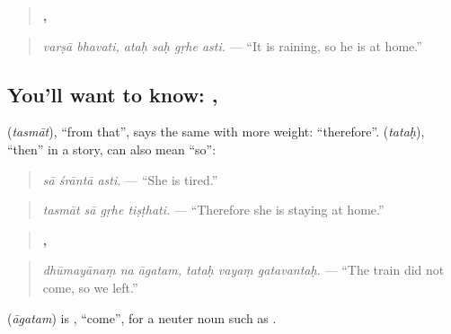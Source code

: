 \begin{quote}
\textbf{ ,    }
\end{quote}

\begin{quote}
\emph{varṣā bhavati, ataḥ saḥ gṛhe asti.} — \textquotedblleft{}It is raining, so he is at home.\textquotedblright{}
\end{quote}

\subsection*{You'll want to know: , }
\textbf{} (\emph{tasmāt}), \textquotedblleft{}from that\textquotedblright{}, says the same with more weight: \textquotedblleft{}therefore\textquotedblright{}. \textbf{} (\emph{tataḥ}), \textquotedblleft{}then\textquotedblright{} in a story, can also mean \textquotedblleft{}so\textquotedblright{}:

\begin{quote}
\textbf{  }
\end{quote}

\begin{quote}
\emph{sā śrāntā asti.} — \textquotedblleft{}She is tired.\textquotedblright{}
\end{quote}

\begin{quote}
\textbf{   }
\end{quote}

\begin{quote}
\emph{tasmāt sā gṛhe tiṣṭhati.} — \textquotedblleft{}Therefore she is staying at home.\textquotedblright{}
\end{quote}

\begin{quote}
\textbf{  ,   }
\end{quote}

\begin{quote}
\emph{dhūmayānaṃ na āgatam, tataḥ vayaṃ gatavantaḥ.} — \textquotedblleft{}The train did not come, so we left.\textquotedblright{}
\end{quote}

\textbf{} (\emph{āgatam}) is \textbf{}, \textquotedblleft{}come\textquotedblright{}, for a neuter noun such as \textbf{}.

